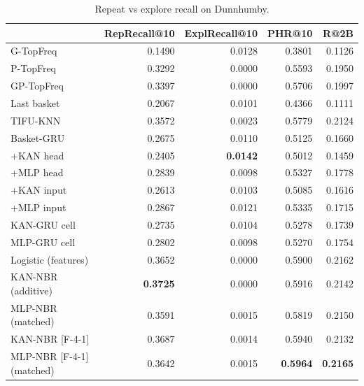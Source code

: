 \begin{table}[H]
\centering\small
\caption{Repeat vs explore recall on Dunnhumby.}
\label{tab:repeat_dunnhumby}
\begin{tabular}{lrrrr}
\toprule
 & RepRecall@10 & ExplRecall@10 & PHR@10 & R@2B \\
\midrule
G-TopFreq & 0.1490 & 0.0128 & 0.3801 & 0.1126 \\
P-TopFreq & 0.3292 & 0.0000 & 0.5593 & 0.1950 \\
GP-TopFreq & 0.3397 & 0.0000 & 0.5706 & 0.1997 \\
Last basket & 0.2067 & 0.0101 & 0.4366 & 0.1111 \\
TIFU-KNN & 0.3572 & 0.0023 & 0.5779 & 0.2124 \\
Basket-GRU & 0.2675 & 0.0110 & 0.5125 & 0.1660 \\
+KAN head & 0.2405 & \textbf{0.0142} & 0.5012 & 0.1459 \\
+MLP head & 0.2839 & 0.0098 & 0.5327 & 0.1778 \\
+KAN input & 0.2613 & 0.0103 & 0.5085 & 0.1616 \\
+MLP input & 0.2867 & 0.0121 & 0.5335 & 0.1715 \\
KAN-GRU cell & 0.2735 & 0.0104 & 0.5278 & 0.1739 \\
MLP-GRU cell & 0.2802 & 0.0098 & 0.5270 & 0.1754 \\
Logistic (features) & 0.3652 & 0.0000 & 0.5900 & 0.2162 \\
KAN-NBR (additive) & \textbf{0.3725} & 0.0000 & 0.5916 & 0.2142 \\
MLP-NBR (matched) & 0.3591 & 0.0015 & 0.5819 & 0.2150 \\
KAN-NBR [F-4-1] & 0.3687 & 0.0014 & 0.5940 & 0.2132 \\
MLP-NBR [F-4-1] (matched) & 0.3642 & 0.0015 & \textbf{0.5964} & \textbf{0.2165} \\
\bottomrule
\end{tabular}
\end{table}
